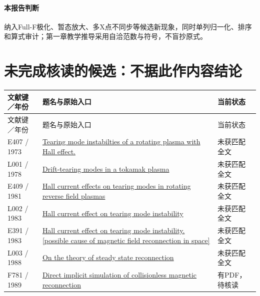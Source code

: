 \paragraph{本报告判断}纳入Full-F极化、暂态放大、多X点不同步等候选新现象，同时单列归一化、排序和算式审计；第一章教学推导采用自洽范数与符号，不盲抄原式。


\section{未完成核读的候选：不据此作内容结论}

\small\begin{longtable}{P{24mm}P{97mm}P{27mm}}

\toprule 文献键／年份 & 题名与原始入口 & 当前状态\\\midrule\endfirsthead

\toprule 文献键／年份 & 题名与原始入口 & 当前状态\\\midrule\endhead

E407 / 1973 & \href{http://www.osti.gov/scitech/biblio/4575517-tearing-mode-instabilties-rotating-plasma-hall-effect}{Tearing mode instabilties of a rotating plasma with Hall effect.} & 未获匹配全文\\

L001 / 1978 & \href{https://doi.org/10.1088/0029-5515/18/8/003}{Drift-tearing modes in a tokamak plasma} & 未获匹配全文\\

E409 / 1981 & \href{https://doi.org/10.1017/s0022377800022996}{Hall current effects on tearing modes in rotating reverse field plasmas} & 未获匹配全文\\

L002 / 1983 & \href{https://doi.org/10.1029/gl010i006p00475}{Hall current effect on tearing mode instability} & 未获匹配全文\\

E391 / 1983 & \href{https://ntrs.nasa.gov/search.jsp?R=19830053518}{Hall current effect on tearing mode instability. [possible cause of magnetic field reconnection in space]} & 未获匹配全文\\

L003 / 1988 & \href{https://doi.org/10.1016/0010-4655(88)90222-6}{On the theory of steady state reconnection} & 未获匹配全文\\

F781 / 1989 & \href{https://www.osti.gov/servlets/purl/7161998}{Direct implicit simulation of collisionless magnetic reconnection} & 有PDF，待核读\\


\end{longtable}
